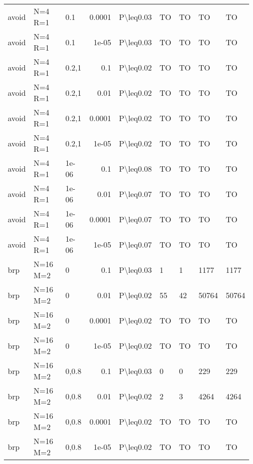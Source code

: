\begin{longtable}{lllrlllll}
 avoid         & N=4 R=1   & 0.1   & 0.0001 & P\textbackslash{}leq0.03  & TO   & TO   & TO       & TO      \\
 avoid         & N=4 R=1   & 0.1   & 1e-05  & P\textbackslash{}leq0.03  & TO   & TO   & TO       & TO      \\
 avoid         & N=4 R=1   & 0.2,1 & 0.1    & P\textbackslash{}leq0.02  & TO   & TO   & TO       & TO      \\
 avoid         & N=4 R=1   & 0.2,1 & 0.01   & P\textbackslash{}leq0.02  & TO   & TO   & TO       & TO      \\
 avoid         & N=4 R=1   & 0.2,1 & 0.0001 & P\textbackslash{}leq0.02  & TO   & TO   & TO       & TO      \\
 avoid         & N=4 R=1   & 0.2,1 & 1e-05  & P\textbackslash{}leq0.02  & TO   & TO   & TO       & TO      \\
 avoid         & N=4 R=1   & 1e-06 & 0.1    & P\textbackslash{}leq0.08  & TO   & TO   & TO       & TO      \\
 avoid         & N=4 R=1   & 1e-06 & 0.01   & P\textbackslash{}leq0.07  & TO   & TO   & TO       & TO      \\
 avoid         & N=4 R=1   & 1e-06 & 0.0001 & P\textbackslash{}leq0.07  & TO   & TO   & TO       & TO      \\
 avoid         & N=4 R=1   & 1e-06 & 1e-05  & P\textbackslash{}leq0.07  & TO   & TO   & TO       & TO      \\
 brp           & N=16 M=2  & 0     & 0.1    & P\textbackslash{}leq0.03  & 1    & 1    & 1177     & 1177    \\
 brp           & N=16 M=2  & 0     & 0.01   & P\textbackslash{}leq0.02  & 55   & 42   & 50764    & 50764   \\
 brp           & N=16 M=2  & 0     & 0.0001 & P\textbackslash{}leq0.02  & TO   & TO   & TO       & TO      \\
 brp           & N=16 M=2  & 0     & 1e-05  & P\textbackslash{}leq0.02  & TO   & TO   & TO       & TO      \\
 brp           & N=16 M=2  & 0,0.8 & 0.1    & P\textbackslash{}leq0.03  & 0    & 0    & 229      & 229     \\
 brp           & N=16 M=2  & 0,0.8 & 0.01   & P\textbackslash{}leq0.02  & 2    & 3    & 4264     & 4264    \\
 brp           & N=16 M=2  & 0,0.8 & 0.0001 & P\textbackslash{}leq0.02  & TO   & TO   & TO       & TO      \\
 brp           & N=16 M=2  & 0,0.8 & 1e-05  & P\textbackslash{}leq0.02  & TO   & TO   & TO       & TO      \\

\end{longtable}
